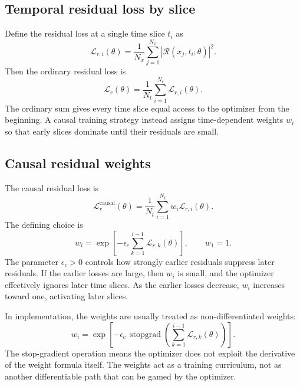 \documentclass[11pt]{article}
\newcommand{\stgrad}{\operatorname{stopgrad}}
\begin{document}
\subsection{Temporal residual loss by slice}

Define the residual loss at a single time slice $t_i$ as
\begin{equation}
\mathcal{L}_{r,i}(\theta)=\frac{1}{N_x}\sum_{j=1}^{N_x}
\left|\mathcal{R}(x_j,t_i;\theta)\right|^2.
\label{eq:time_slice_residual_loss}
\end{equation}
Then the ordinary residual loss is
\begin{equation}
\mathcal{L}_r(\theta)=\frac{1}{N_t}\sum_{i=1}^{N_t}\mathcal{L}_{r,i}(\theta).
\label{eq:ordinary_residual_by_slice}
\end{equation}
The ordinary sum gives every time slice equal access to the optimizer from the beginning. A causal training strategy instead assigns time-dependent weights $w_i$ so that early slices dominate until their residuals are small.

\subsection{Causal residual weights}

The causal residual loss is
\begin{equation}
\mathcal{L}_{r}^{\mathrm{causal}}(\theta)=\frac{1}{N_t}\sum_{i=1}^{N_t}w_i\mathcal{L}_{r,i}(\theta).
\label{eq:causal_residual_loss_general}
\end{equation}
The defining choice is
\begin{equation}
w_i=\exp\left[-\epsilon_c\sum_{k=1}^{i-1}\mathcal{L}_{r,k}(\theta)\right],
\qquad w_1=1.
\label{eq:causal_weight_basic}
\end{equation}
The parameter $\epsilon_c>0$ controls how strongly earlier residuals suppress later residuals. If the earlier losses are large, then $w_i$ is small, and the optimizer effectively ignores later time slices. As the earlier losses decrease, $w_i$ increases toward one, activating later slices.

In implementation, the weights are usually treated as non-differentiated weights:
\begin{equation}
w_i=\exp\left[-\epsilon_c\,\stgrad\left(\sum_{k=1}^{i-1}\mathcal{L}_{r,k}(\theta)\right)\right].
\label{eq:causal_weight_stop_gradient}
\end{equation}
The stop-gradient operation means the optimizer does not exploit the derivative of the weight formula itself. The weights act as a training curriculum, not as another differentiable path that can be gamed by the optimizer.
\end{document}
